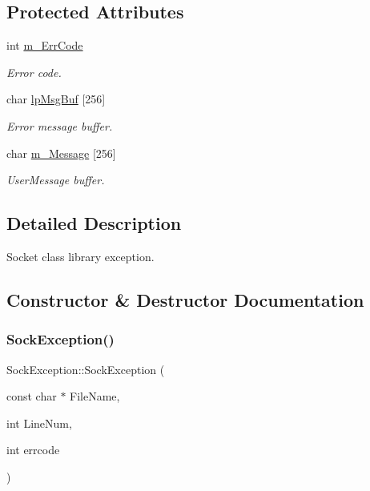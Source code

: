\subsection*{Protected Attributes}
\begin{DoxyCompactItemize}
\item 
int \hyperlink{classSockException_aa0b3cd8672ed45e8f61f0c94517d237c}{m\+\_\+\+Err\+Code}
\begin{DoxyCompactList}\small\item\em Error code. \end{DoxyCompactList}\item 
char \hyperlink{classSockException_a20f0f8c9f9c66905bba850c5ee508797}{lp\+Msg\+Buf} \mbox{[}256\mbox{]}
\begin{DoxyCompactList}\small\item\em Error message buffer. \end{DoxyCompactList}\item 
char \hyperlink{classSockException_ac9190a7ac09341189d5dfab54430c258}{m\+\_\+\+Message} \mbox{[}256\mbox{]}
\begin{DoxyCompactList}\small\item\em User\+Message buffer. \end{DoxyCompactList}\end{DoxyCompactItemize}


\subsection{Detailed Description}
Socket class library exception. 

\subsection{Constructor \& Destructor Documentation}
\mbox{\label{classSockException_a8ba3515f80c0b12b52dadbabf3778eef}} 
\subsubsection{\texorpdfstring{Sock\+Exception()}{SockException()}\hspace{0.1cm}{\footnotesize\ttfamily [1/2]}}
{\footnotesize\ttfamily Sock\+Exception\+::\+Sock\+Exception (\begin{DoxyParamCaption}\item[{const char $\ast$}]{File\+Name,  }\item[{int}]{Line\+Num,  }\item[{int}]{errcode }\end{DoxyParamCaption})}

